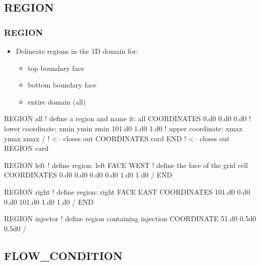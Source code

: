 \documentclass{beamer}
\newcommand\bluecomment[1]{{{\color{blue} #1}}}
\newcommand\greencomment[1]{{{\color{green} #1}}}
\begin{document}
\subsection{REGION}

\begin{frame}\frametitle{REGION}

\begin{itemize}
  \item Delineate regions in the 1D domain for:
  \begin{itemize}
    \item top boundary face
    \item bottom boundary face
    \item entire domain (all)
  \end{itemize}
\end{itemize}

\begin{semiverbatim}
REGION all            \bluecomment{! define a region and name it: \greencomment{all}}
  COORDINATES        
    0.d0 0.d0 0.d0    \bluecomment{! lower coordinate: xmin ymin zmin}
    101.d0 1.d0 1.d0   \bluecomment{! upper coordinate: xmax ymax zmax}
  /   \bluecomment{! <-- closes out COORDINATES card}
END   \bluecomment{! <-- closes out REGION card}

\newpage
REGION left            \bluecomment{! define region:} \greencomment{left}
  FACE WEST            \bluecomment{! define the face of the grid cell}
  COORDINATES         
    0.d0 0.d0 0.d0
    0.d0 1.d0 1.d0
  /
END

REGION right         \bluecomment{! define region:} \greencomment{right}
  FACE EAST         
  COORDINATES         
    101.d0 0.d0 0.d0    
    101.d0 1.d0 1.d0
  /
END

REGION injector   \bluecomment{! define region containing injection}
  COORDINATE 51.d0 0.5d0 0.5d0
/

\end{semiverbatim}

\end{frame}

\subsection{FLOW\_CONDITION}
\end{document}
